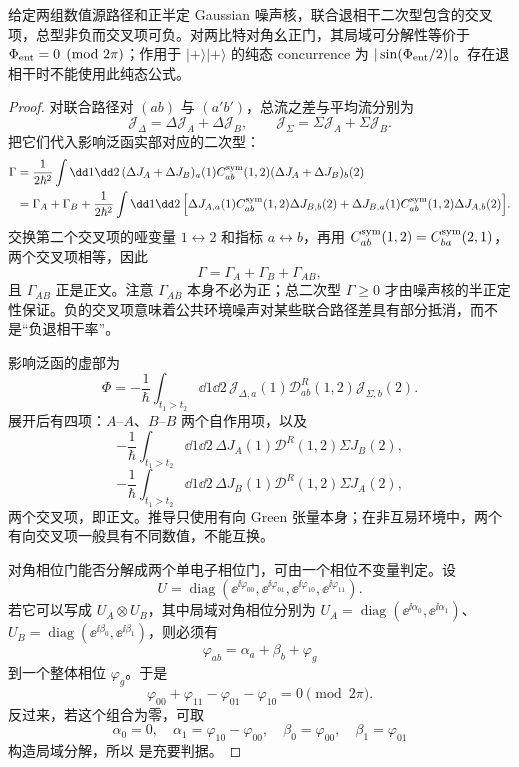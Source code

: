 \begin{proposition}
给定两组数值源路径和正半定 Gaussian 噪声核，联合退相干二次型包含的交叉项，总型非负而交叉项可负。对两比特对角幺正门，其局域可分解性等价于 $\Phi_{\rm ent}=0\pmod{2\pi}$；作用于 $|+\rangle|+\rangle$ 的纯态 concurrence 为 $|\sin(\Phi_{\rm ent}/2)|$。存在退相干时不能使用此纯态公式。
\end{proposition}
\begin{proof}
对联合路径对 $(ab)$ 与 $(a'b')$，总流之差与平均流分别为
\[
\mathcal J_\Delta
=\Delta\mathcal J_A+\Delta\mathcal J_B,
\qquad
\mathcal J_\Sigma
=\Sigma\mathcal J_A+\Sigma\mathcal J_B.
\]
把它们代入影响泛函实部对应的二次型：
\begin{align*}
\Gamma
&=\frac1{2\hbar^2}\int\dd1\dd2\,
(\Delta J_A+\Delta J_B)_a(1)
C_{ab}^{\rm sym}(1,2)
(\Delta J_A+\Delta J_B)_b(2)\\
&=\Gamma_A+\Gamma_B
+\frac1{2\hbar^2}\int\dd1\dd2\,
\Big[
\Delta J_{A,a}(1)C_{ab}^{\rm sym}(1,2)\Delta J_{B,b}(2)
+\Delta J_{B,a}(1)C_{ab}^{\rm sym}(1,2)\Delta J_{A,b}(2)
\Big].
\end{align*}
交换第二个交叉项的哑变量 $1\leftrightarrow2$ 和指标 $a\leftrightarrow b$，再用
$C_{ab}^{\rm sym}(1,2)=C_{ba}^{\rm sym}(2,1)$，两个交叉项相等，因此
\[
\Gamma=\Gamma_A+\Gamma_B+\Gamma_{AB},
\]
且 $\Gamma_{AB}$ 正是正文。注意 $\Gamma_{AB}$ 本身不必为正；总二次型 $\Gamma\ge0$ 才由噪声核的半正定性保证。负的交叉项意味着公共环境噪声对某些联合路径差具有部分抵消，而不是“负退相干率”。

影响泛函的虚部为
\[
\Phi
=-\frac1\hbar
\int_{t_1>t_2}\dd1\dd2\,
\mathcal J_{\Delta,a}(1)
\mathcal D^R_{ab}(1,2)
\mathcal J_{\Sigma,b}(2).
\]
展开后有四项：$A$--$A$、$B$--$B$ 两个自作用项，以及
\[
-\frac1\hbar\int_{t_1>t_2}\dd1\dd2\,
\Delta J_A(1)\mathcal D^R(1,2)\Sigma J_B(2),
\]
\[
-\frac1\hbar\int_{t_1>t_2}\dd1\dd2\,
\Delta J_B(1)\mathcal D^R(1,2)\Sigma J_A(2),
\]
两个交叉项，即正文。推导只使用有向 Green 张量本身；在非互易环境中，两个有向交叉项一般具有不同数值，不能互换。

对角相位门能否分解成两个单电子相位门，可由一个相位不变量判定。设
\[
U=\operatorname{diag}
(\ee^{\ii\varphi_{00}},\ee^{\ii\varphi_{01}},
 \ee^{\ii\varphi_{10}},\ee^{\ii\varphi_{11}}).
\]
若它可以写成
$U_A\otimes U_B$，其中局域对角相位分别为
$U_A=\operatorname{diag}(\ee^{\ii\alpha_0},\ee^{\ii\alpha_1})$、
$U_B=\operatorname{diag}(\ee^{\ii\beta_0},\ee^{\ii\beta_1})$，则必须有
\[
\varphi_{ab}=\alpha_a+\beta_b+\varphi_g
\]
到一个整体相位 $\varphi_g$。于是
\[
\varphi_{00}+\varphi_{11}-\varphi_{01}-\varphi_{10}=0\pmod{2\pi}.
\]
反过来，若这个组合为零，可取
\[
\alpha_0=0,\quad
\alpha_1=\varphi_{10}-\varphi_{00},\quad
\beta_0=\varphi_{00},\quad
\beta_1=\varphi_{01}
\]
构造局域分解，所以 是充要判据。


\end{proof}
